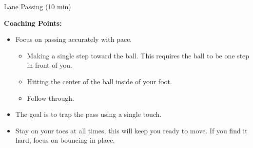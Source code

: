 \begin{oddBlock}{Lane Passing (10 min)}
\begin{minipage}[t]{\linewidth}
\begin{minipage}{.6\linewidth}
        \textbf{Coaching Points:}
        \begin{itemize}
        \setlength{\itemsep}{0pt}
        \setlength{\parskip}{0pt}
        \setlength{\parsep}{0pt}
        \item Focus on passing accurately with pace.
        \begin{itemize}
            \setlength{\itemsep}{0pt}
            \setlength{\parskip}{0pt}
            \setlength{\parsep}{0pt}
            \item Making a single step toward the ball.  This requires the ball to be one step in front of you.
            \item Hitting the center of the ball inside of your foot.
            \item Follow through.
        \end{itemize} 
        \item The goal is to trap the pass using a single touch.
        \item Stay on your toes at all times, this will keep you ready to move.  If you find it hard, focus on bouncing in place.
        \end{itemize}

    \end{minipage}
\end{minipage}

\end{oddBlock}